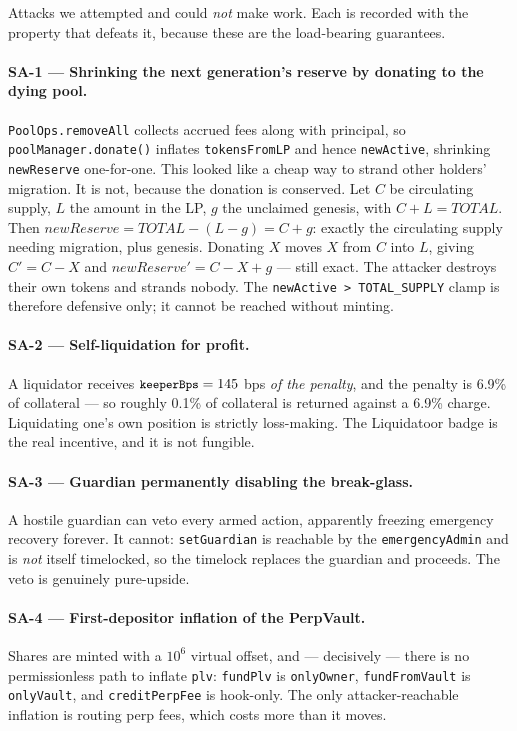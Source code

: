 \documentclass[10pt,a4paper]{article}
\newcommand{\code}[1]{\texttt{\small #1}}
\begin{document}
Attacks we attempted and could \emph{not} make work. Each is recorded with the property
that defeats it, because these are the load-bearing guarantees.

\paragraph{SA-1 --- Shrinking the next generation's reserve by donating to the dying pool.}
\code{PoolOps.removeAll} collects accrued fees along with principal, so
\code{poolManager.donate()} inflates \code{tokensFromLP} and hence \code{newActive},
shrinking \code{newReserve} one-for-one. This looked like a cheap way to strand other
holders' migration. It is not, because the donation is conserved. Let $C$ be circulating
supply, $L$ the amount in the LP, $g$ the unclaimed genesis, with $C+L=\textit{TOTAL}$.
Then $\textit{newReserve} = \textit{TOTAL} - (L - g) = C + g$: exactly the circulating
supply needing migration, plus genesis. Donating $X$ moves $X$ from $C$ into $L$, giving
$C' = C-X$ and $\textit{newReserve}' = C-X+g$ --- still exact. The attacker destroys their
own tokens and strands nobody. The \code{newActive > TOTAL\_SUPPLY} clamp is therefore
defensive only; it cannot be reached without minting.

\paragraph{SA-2 --- Self-liquidation for profit.} A liquidator receives
$\code{keeperBps}=145$ bps \emph{of the penalty}, and the penalty is 6.9\% of collateral ---
so roughly 0.1\% of collateral is returned against a 6.9\% charge. Liquidating one's own
position is strictly loss-making. The Liquidatoor badge is the real incentive, and it is
not fungible.

\paragraph{SA-3 --- Guardian permanently disabling the break-glass.} A hostile guardian can
veto every armed action, apparently freezing emergency recovery forever. It cannot:
\code{setGuardian} is reachable by the \code{emergencyAdmin} and is \emph{not} itself
timelocked, so the timelock replaces the guardian and proceeds. The veto is genuinely
pure-upside.

\paragraph{SA-4 --- First-depositor inflation of the PerpVault.} Shares are minted with a
$10^6$ virtual offset, and --- decisively --- there is no permissionless path to inflate
\code{plv}: \code{fundPlv} is \code{onlyOwner}, \code{fundFromVault} is \code{onlyVault},
and \code{creditPerpFee} is hook-only. The only attacker-reachable inflation is routing
perp fees, which costs more than it moves.
\end{document}
